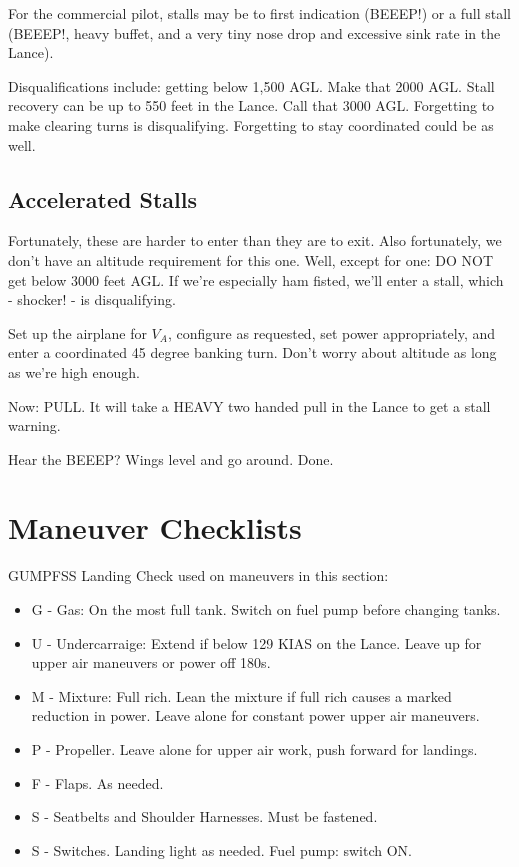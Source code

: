For the commercial pilot, stalls may be to first indication (BEEEP!) or a full stall (BEEEP!, heavy buffet, and a very tiny nose drop and excessive sink rate in the Lance).

Disqualifications include: getting below 1,500 AGL. Make that 2000 AGL. Stall recovery can be up to 550 feet in the Lance. Call that 3000 AGL. Forgetting to make clearing turns is disqualifying. Forgetting to stay coordinated could be as well.

\subsection{Accelerated Stalls}

Fortunately, these are harder to enter than they are to exit. Also fortunately, we don't have an altitude requirement for this one. Well, except for one: DO NOT get below 3000 feet AGL. If we're especially ham fisted, we'll enter a stall, which - shocker! - is disqualifying.

Set up the airplane for $V_A$, configure as requested, set power appropriately, and enter a coordinated 45 degree banking turn. Don't worry about altitude as long as we're high enough.

Now: PULL. It will take a HEAVY two handed pull in the Lance to get a stall warning.

Hear the BEEEP? Wings level and go around. Done.

\section{Maneuver Checklists}

GUMPFSS Landing Check used on maneuvers in this section:
\begin{itemize}
    \item G - Gas: On the most full tank. Switch on fuel pump before changing tanks.
    \item U - Undercarraige: Extend if below 129 KIAS on the Lance. Leave up for upper air maneuvers or power off 180s.
    \item M - Mixture: Full rich. Lean the mixture if full rich causes a marked reduction in power. Leave alone for constant power upper air maneuvers.
    \item P - Propeller. Leave alone for upper air work, push forward for landings.
    \item F - Flaps. As needed.
    \item S - Seatbelts and Shoulder Harnesses. Must be fastened.
    \item S - Switches. Landing light as needed. Fuel pump: switch ON.

\end{itemize}

